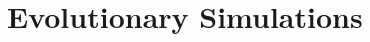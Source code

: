 \documentclass[11pt]{article}
\theoremstyle{plainCl1}
\theoremstyle{plainCl2}
\begin{document}

\section{Evolutionary Simulations}


\end{document}
